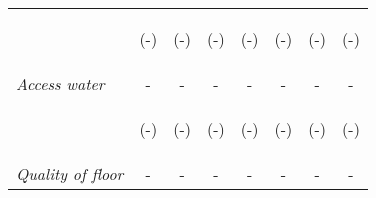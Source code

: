 \begin{tabular}{lccccccc}
\vspace{4pt} & \begin{footnotesize}(-)\end{footnotesize} &  \begin{footnotesize}(-)\end{footnotesize}  &  \begin{footnotesize}(-)\end{footnotesize}    &   \begin{footnotesize}(-)\end{footnotesize}   &   \begin{footnotesize}(-)\end{footnotesize}  &  \begin{footnotesize}(-)\end{footnotesize} &  \begin{footnotesize}(-)\end{footnotesize} \\                    



\textit{Access water}          		  &  -    &    -   &     -  &  -  &     -  & -   & -    \\

\vspace{4pt} & \begin{footnotesize}(-)\end{footnotesize} &  \begin{footnotesize}(-)\end{footnotesize}  &  \begin{footnotesize}(-)\end{footnotesize}    &   \begin{footnotesize}(-)\end{footnotesize}   &   \begin{footnotesize}(-)\end{footnotesize}  &  \begin{footnotesize}(-)\end{footnotesize} &  \begin{footnotesize}(-)\end{footnotesize} \\          



\textit{Quality of floor}          		  &  -    &    -   &     -  &  -  &     -  & -  &   -    \\


\end{tabular}
